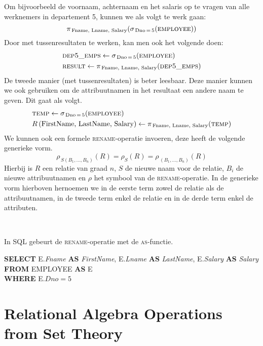 Om bijvoorbeeld de voornaam, achternaam en het salaris op te vragen van alle werknemers in departement 5, kunnen we als volgt te werk gaan:
\vspace{-2mm}
\[\pi_{\,\text{Fname, Lname, Salary}}(\sigma_{\,\text{Dno}\,=\,5}(\textsc{employee}))\]
\noindent Door met tussenresultaten te werken, kan men ook het volgende doen:
\vspace{-2mm}
\begin{align*}
&\textsc{dep5\_emps} \leftarrow \sigma_{\,\text{Dno}\,=\,5}(\textsc{employee}) \\
&\textsc{result} \leftarrow \pi_{\,\text{Fname, Lname, Salary}}(\textsc{dep5\_emps})
\end{align*}
De tweede manier (met tussenresultaten) is beter leesbaar. Deze manier kunnen we ook gebruiken om de attribuutnamen in het resultaat een andere naam te geven. Dit gaat als volgt.
\vspace{-2mm}\begin{align*}
&\textsc{temp} \leftarrow \sigma_{\,\text{Dno}\,=\,5}(\textsc{employee}) \\
&R\,(\text{FirstName, LastName, Salary}) \leftarrow \pi_{\,\text{Fname, Lname, Salary}}(\textsc{temp})
\end{align*}
We kunnen ook een formele \textsc{rename}-operatie invoeren, deze heeft de volgende generieke vorm.
\vspace{-2mm}
\[ \rho_{\,S(B_1,\dots,B_n)}(R) = \rho_S(R) = \rho_{\,(B_1,\dots,B_n)}(R) \]
Hierbij is $R$ een relatie van graad $n$, $S$ de nieuwe naam voor de relatie, $B_i$ de nieuwe attribuutnamen en $\rho$ het symbool van de \textsc{rename}-operatie. In de generieke vorm hierboven hernoemen we in de eerste term zowel de relatie als de attribuutnamen, in de tweede term enkel de relatie en in de derde term enkel de attributen.

~

\noindent In SQL gebeurt de \textsc{rename}-operatie met de \textsc{as}-functie.

\vspace{2mm}
\indent \textbf{SELECT} E.\textit{Fname} \textbf{AS} \textit{FirstName}, E.\textit{Lname} \textbf{AS} \textit{LastName}, E.\textit{Salary} \textbf{AS} \textit{Salary\\}
\indent \textbf{FROM} EMPLOYEE \textbf{AS} E\\
\indent \textbf{WHERE} E.$\textit{Dno}=5$



\section{Relational Algebra Operations from Set Theory}
